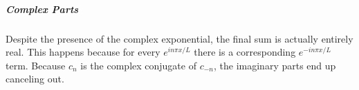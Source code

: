 \documentclass[11pt]{article}
\begin{document}
	\subparagraph{Complex Parts} Despite the presence of the complex exponential, the final sum is actually entirely real. This happens because for every $e^{in\pi x/L}$ there is a corresponding $e^{-in\pi x/L}$ term. Because $c_n$ is the complex conjugate of $c_{-n}$, the imaginary parts end up canceling out.

%		
%		


\end{document}
